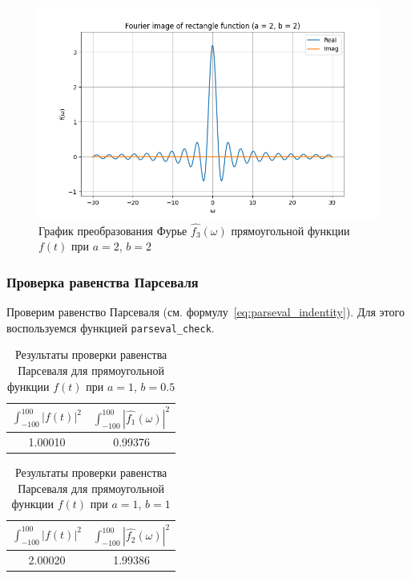 \begin{figure}[ht!]
    \centering
    \includegraphics[width=\textwidth]{media/rectangle_3_image.png}
    \caption{График преобразования Фурье $\hat{f_3}(\omega)$ прямоугольной функции $f(t)$ при $a = 2$, $b = 2$}
    \label{fig:rectangle_3_image}
\end{figure}

\FloatBarrier
\subsubsection{Проверка равенства Парсеваля}
Проверим равенство Парсеваля (см. формулу~\eqref{eq:parseval_indentity}). Для этого воспользуемся функцией \texttt{parseval\_check}. 
\begin{table}[ht!]
    \centering
    \begin{tabular}{|c|c|}
        \hline
        $\displaystyle\int_{-100}^{100}{|f(t)|^2}$ & $\displaystyle\int_{-100}^{100}{|\hat{f_1}(\omega)|^2}$ \\
        \hline
        1.00010 & 0.99376 \\
        \hline
    \end{tabular}
    \caption{Результаты проверки равенства Парсеваля для прямоугольной функции $f(t)$ при $a = 1$, $b = 0.5$}
    \label{tab:rectangle_1_parseval_check}
\end{table}

\begin{table}[ht!]
    \centering
    \begin{tabular}{|c|c|}
        \hline
        $\displaystyle\int_{-100}^{100}{|f(t)|^2}$ & $\displaystyle\int_{-100}^{100}{|\hat{f_2}(\omega)|^2}$ \\
        \hline
        2.00020 & 1.99386 \\
        \hline
    \end{tabular}
    \caption{Результаты проверки равенства Парсеваля для прямоугольной функции $f(t)$ при $a = 1$, $b = 1$}
    \label{tab:rectangle_2_parseval_check}
\end{table}

